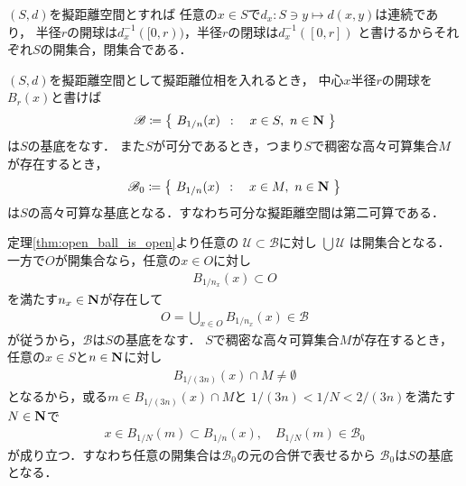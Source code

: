	\begin{prf}
		$(S,d)$を擬距離空間とすれば
		任意の$x \in S$で$d_x:S \ni y \longmapsto d(x,y)$は連続であり，
		半径$r$の開球は$d_x^{-1}([0,r))$，半径$r$の閉球は$d_x^{-1}([0,r])$
		と書けるからそれぞれ$S$の開集合，閉集合である．
		\QED
	\end{prf}
	
	\begin{screen}
		\begin{thm}[擬距離空間において開球全体は基底をなす]
		\label{thm:base_on_pseudometric_space}
			$(S,d)$を擬距離空間として擬距離位相を入れるとき，
			中心$x$半径$r$の開球を$B_r(x)$と書けば
			\begin{align}
				\mathscr{B} \coloneqq \left\{\ B_{1/n}(x)\ \, : \quad x \in S,\ n \in \mathbf{N}\ \right\}
				\label{eq:thm_base_on_pseudometric_space_1}
			\end{align}
			は$S$の基底をなす．
			また$S$が可分であるとき，つまり$S$で稠密な高々可算集合$M$が存在するとき，
			\begin{align}
				\mathscr{B}_0 \coloneqq \left\{\ B_{1/n}(x)\ \, : \quad x \in M,\ n \in \mathbf{N}\ \right\}
			\end{align}
			は$S$の高々可算な基底となる．すなわち可分な擬距離空間は第二可算である．
		\end{thm}
	\end{screen}
	
	\begin{prf}
		定理\ref{thm:open_ball_is_open}より任意の
		$\mathscr{U} \subset \mathscr{B}$に対し
		$\bigcup \mathscr{U}$
		は開集合となる．一方で$O$が開集合なら，任意の$x \in O$に対し
		\begin{align}
			B_{1/n_x}(x) \subset O
		\end{align}
		を満たす$n_x \in \mathbf{N}$が存在して
		\begin{align}
			O = \bigcup_{x \in O} B_{1/n_x}(x) \in \mathscr{B}
		\end{align}
		が従うから，$\mathscr{B}$は$S$の基底をなす．
		$S$で稠密な高々可算集合$M$が存在するとき，
		任意の$x \in S$と$n \in \mathbf{N}$に対し
		\begin{align}
			B_{1/(3n)}(x) \cap M \neq \emptyset
		\end{align}
		となるから，或る$m \in B_{1/(3n)}(x) \cap M$と
		$1/(3n) < 1/N < 2/(3n)$を満たす$N \in \mathbf{N}$で
		\begin{align}
			x \in B_{1/N}(m) \subset B_{1/n}(x),\quad B_{1/N}(m) \in \mathscr{B}_0
		\end{align}
		が成り立つ．すなわち任意の開集合は$\mathscr{B}_0$の元の合併で表せるから
		$\mathscr{B}_0$は$S$の基底となる．
		\QED
	\end{prf}
	
